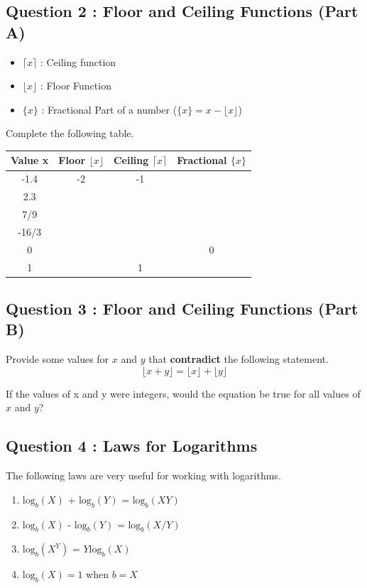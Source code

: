 \documentclass[]{article}
\begin{document}
	\subsection*{Question 2 : Floor and Ceiling Functions (Part A)}
\begin{framed}	\begin{itemize}
		\item $\lceil x\rceil$ : Ceiling function
		\item $\lfloor x\rfloor$  : Floor Function
		\item $\{x\}$ : Fractional Part of a number
		($\{x\} = x- \lfloor x\rfloor$)
	\end{itemize}
\end{framed}	\bigskip
	Complete the following table.
	\begin{center}
		{ \large 
			\begin{tabular}{|c|c|c|c|} \hline
				Value x & Floor $\lfloor x\rfloor$ & Ceiling  $\lceil x\rceil$ & Fractional $ \{ x \} $\\ \hline
				-1.4  &	-2	&-1&	 \\ \hline
				2.3&	&		& \\ \hline
				7/9&		&		& \\ \hline 
				-16/3&		&		& \\ \hline
				0 & 	&		& 0 \\ \hline
				1 & 	&	1	& \\
				\hline
			\end{tabular} 
		}
	\end{center}
	\bigskip
	\subsection*{Question 3 : Floor and Ceiling Functions (Part B)}
	Provide some values for $x$ and $y$ that \textbf{contradict} the following statement.
	\[ \lfloor x + y \rfloor  = \lfloor x\rfloor + \lfloor y \rfloor\]
	
	\noindent If the values of x and y were integers, would the equation be true for all values of $x$ and $y$?
	



	\subsection*{Question 4 : Laws for Logarithms}
	The following laws are very useful for working with logarithms.\bigskip
	\begin{framed}
	\begin{multicols}{2}
	\begin{enumerate}
		\item $\mbox{log}_b(X)$ + $\mbox{log}_b(Y)$ = $\mbox{log}_b(XY)$\bigskip
		\item $\mbox{log}_b(X)$ - $\mbox{log}_b(Y)$ = $\mbox{log}_b(X / Y)$ \bigskip
		\item $\mbox{log}_b(X^Y)$ = $Y \mbox{log}_b(X)$
		
		\item $\mbox{log}_b(X) = 1 $ when $b=X$
	\end{enumerate}
	\end{multicols}
	\end{framed}
\end{document}
